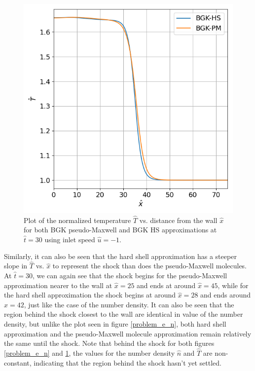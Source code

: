 \documentclass[a4paper]{article}
\begin{document}
\clearpage
\begin{figure}[hbt!]
    \centering
    \includegraphics[width=14cm]{plots/problem_e_T.png}
    \caption{\centering Plot of the normalized temperature $\hat{T}$ vs. distance from the wall $\hat{x}$ for both BGK pseudo-Maxwell and BGK HS approximations at $\hat{t} = 30$ using inlet speed $\hat{u} = -1$.}
    \label{problem_e_T}
\end{figure}
Similarly, it can also be seen that the hard shell approximation has a steeper slope in $\hat{T}$ vs. $\hat{x}$ to represent the shock than does the pseudo-Maxwell molecules. At $\hat{t} = 30$, we can again see that the shock begins for the pseudo-Maxwell approximation nearer to the wall at $\hat{x} = 25$ and ends at around $\hat{x} = 45$, while for the hard shell approximation the shock begins at around $\hat{x} = 28$ and ends around $\hat{x}= 42$, just like the case of the number density. It can also be seen that the region behind the shock closest to the wall are identical in value of the number density, but unlike the plot seen in figure \ref{problem_e_n}, both hard shell approximation and the pseudo-Maxwell molecule approximation remain relatively the same until the shock. Note that behind the shock for both figures \ref{problem_e_n} and \ref{problem_e_T}, the values for the number density $\hat{n}$ and $\hat{T}$ are non-constant, indicating that the region behind the shock hasn't yet settled.
\clearpage
\end{document}

